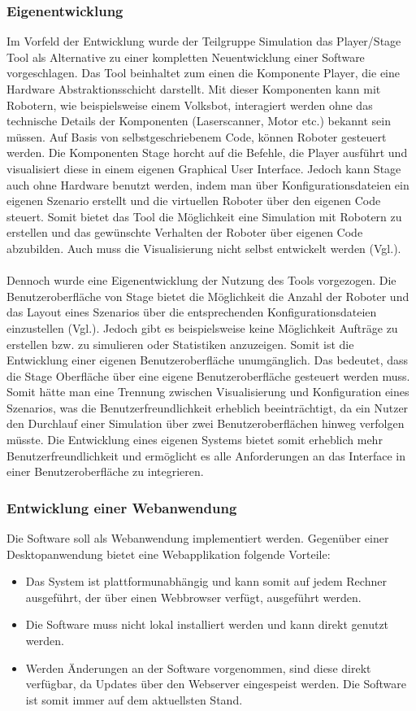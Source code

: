 \subsubsection{Eigenentwicklung}
Im Vorfeld der Entwicklung wurde der Teilgruppe Simulation das Player/Stage Tool als Alternative zu einer kompletten Neuentwicklung einer Software vorgeschlagen. Das Tool beinhaltet zum einen die Komponente Player, die eine Hardware Abstraktionsschicht darstellt. Mit dieser Komponenten kann mit Robotern, wie beispielsweise einem Volksbot, interagiert werden ohne das technische Details der Komponenten (Laserscanner, Motor etc.) bekannt sein müssen. Auf Basis von selbstgeschriebenem Code, können Roboter gesteuert werden. Die Komponenten Stage horcht auf die Befehle, die Player ausführt und visualisiert diese in einem eigenen Graphical User Interface. Jedoch kann Stage auch ohne Hardware benutzt werden, indem man über Konfigurationsdateien ein eigenen Szenario erstellt und die virtuellen Roboter über den eigenen Code steuert. Somit bietet das Tool die Möglichkeit eine Simulation mit Robotern zu erstellen und das gewünschte Verhalten der Roboter über eigenen Code abzubilden. Auch muss die Visualisierung nicht selbst entwickelt werden (Vgl.\cite{plstg}). 
\\\\
Dennoch wurde eine Eigenentwicklung der Nutzung des Tools vorgezogen. Die Benutzeroberfläche von Stage bietet die Möglichkeit die Anzahl der Roboter und das Layout eines Szenarios über die entsprechenden Konfigurationsdateien einzustellen (Vgl.\cite{plstg}). Jedoch gibt es beispielsweise keine Möglichkeit Aufträge zu erstellen bzw. zu simulieren oder Statistiken anzuzeigen. Somit ist die Entwicklung einer eigenen Benutzeroberfläche unumgänglich. Das bedeutet, dass die Stage Oberfläche über eine eigene Benutzeroberfläche gesteuert werden muss. Somit hätte man eine Trennung zwischen Visualisierung und Konfiguration eines Szenarios, was die Benutzerfreundlichkeit erheblich beeinträchtigt, da ein Nutzer den Durchlauf einer Simulation über zwei Benutzeroberflächen hinweg verfolgen müsste. Die Entwicklung eines eigenen Systems bietet somit erheblich mehr Benutzerfreundlichkeit und ermöglicht es alle Anforderungen an das Interface in einer Benutzeroberfläche zu integrieren. 
\subsubsection{Entwicklung einer Webanwendung}\label{sec:Entwicklung einer Webanwendung} 
Die Software soll als Webanwendung implementiert werden. Gegenüber einer Desktopanwendung bietet eine Webapplikation folgende Vorteile:
\begin{itemize}
\item Das System ist plattformunabhängig und kann somit auf jedem Rechner ausgeführt, der über einen Webbrowser verfügt, ausgeführt werden.
\item Die Software muss nicht lokal installiert werden und kann direkt genutzt werden.
\item Werden Änderungen an der Software vorgenommen, sind diese direkt verfügbar, da Updates über den Webserver eingespeist werden. Die Software ist somit immer auf dem aktuellsten Stand. 
\end{itemize}
